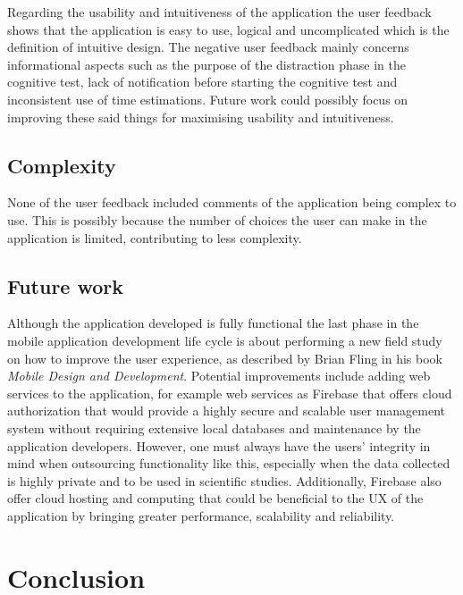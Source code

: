 \documentclass{article}
\begin{document}
Regarding the usability and intuitiveness of the application the user feedback shows that the application is easy to use, logical and uncomplicated which is the definition of intuitive design.\cite{galitz_essential_2007}
The negative user feedback mainly concerns informational aspects such as the purpose of the distraction phase in the cognitive test, lack of notification before starting the cognitive test and inconsistent use of time estimations.\cite{bevan_usability_1994} Future work could possibly focus on improving these said things for maximising usability and intuitiveness.  

\subsection{Complexity}

None of the user feedback included comments of the application being complex to use. This is possibly because the number of choices the user can make in the application is limited, contributing to less complexity.\cite{comber_layout_1997} 

\subsection{Future work}
Although the application developed is fully functional the last phase in the mobile application development life cycle is about performing a new field study on how to improve the user experience, as described by Brian Fling in his book \textit{Mobile Design and Development}.\cite{fling_mobile_2009} 
Potential improvements include adding web services to the application, for example web services as Firebase that offers cloud authorization that would provide a highly secure and scalable user management system without requiring extensive local databases and maintenance by the application developers. However, one must always have the users' integrity in mind when outsourcing functionality like this, especially when the data collected is highly private and to be used in scientific studies.\cite{lund_what_nodate} Additionally, Firebase also offer cloud hosting and computing that could be beneficial to the UX of the application by bringing greater performance, scalability and reliability.\cite{noauthor_cloud_nodate}  

\section{Conclusion}
\end{document}
